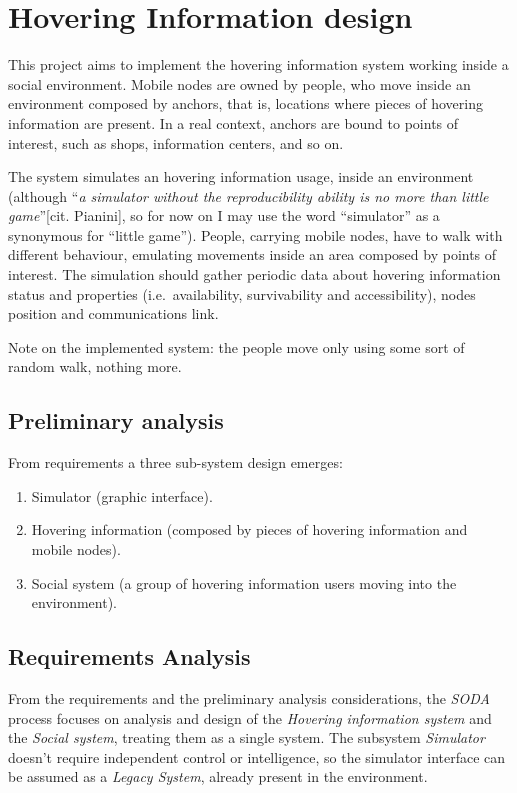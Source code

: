 \section{Hovering Information design}
\label{sec:design}

This project aims to implement the hovering information system working inside
a social environment. Mobile nodes are owned by people, who move inside an
environment composed by anchors, that is, locations where pieces of hovering
information are present. In a real context, anchors are bound to points of
interest, such as shops, information centers, and so on.

The system simulates an hovering information usage, inside an environment
(although ``\emph{a simulator without the reproducibility ability is no more
than little game}''[cit. Pianini], so for now on I may use the word
``simulator'' as a synonymous for ``little game''). People, carrying mobile
nodes, have to walk with different behaviour, emulating movements inside an
area composed by points of interest.  The simulation should gather periodic
data about hovering information status and properties (i.e.\ availability,
survivability and accessibility), nodes position and communications link.

Note on the implemented system: the people move only using some sort of random
walk, nothing more.

\subsection{Preliminary analysis}

From requirements a three sub-system design emerges:
\begin{enumerate}
	\item Simulator (graphic interface).
	\item Hovering information (composed by pieces of hovering information and
		mobile nodes).
	\item Social system (a group of hovering information users moving into
		the environment).
\end{enumerate}

\subsection{Requirements Analysis}

From the requirements and the preliminary analysis considerations, the
\emph{SODA} process focuses on analysis and design of the \emph{Hovering
information system} and the \emph{Social system}, treating them as a single
system. The subsystem \emph{Simulator} doesn't require independent control or
intelligence, so the simulator interface can be assumed as a \emph{Legacy
System}, already present in the environment.


